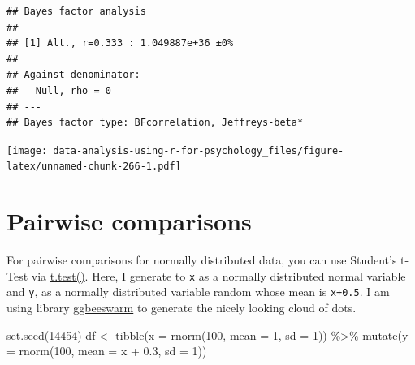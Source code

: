 \documentclass[
]{book}
\newenvironment{Shaded}{\begin{snugshade}}{\end{snugshade}}
\newcommand{\AttributeTok}[1]{\textcolor[rgb]{0.77,0.63,0.00}{#1}}
\newcommand{\ConstantTok}[1]{\textcolor[rgb]{0.00,0.00,0.00}{#1}}
\newcommand{\DecValTok}[1]{\textcolor[rgb]{0.00,0.00,0.81}{#1}}
\newcommand{\FloatTok}[1]{\textcolor[rgb]{0.00,0.00,0.81}{#1}}
\newcommand{\FunctionTok}[1]{\textcolor[rgb]{0.00,0.00,0.00}{#1}}
\newcommand{\NormalTok}[1]{#1}
\newcommand{\OtherTok}[1]{\textcolor[rgb]{0.56,0.35,0.01}{#1}}
\newcommand{\SpecialCharTok}[1]{\textcolor[rgb]{0.00,0.00,0.00}{#1}}
\newcommand{\StringTok}[1]{\textcolor[rgb]{0.31,0.60,0.02}{#1}}
\begin{document}
\begin{verbatim}
## Bayes factor analysis
## --------------
## [1] Alt., r=0.333 : 1.049887e+36 ±0%
## 
## Against denominator:
##   Null, rho = 0 
## ---
## Bayes factor type: BFcorrelation, Jeffreys-beta*
\end{verbatim}

\begin{Shaded}
\end{Shaded}

\texttt{[image: data-analysis-using-r-for-psychology\_files/figure-latex/unnamed-chunk-266-1.pdf]}

\hypertarget{pairwise-comparisons}{%
\section{Pairwise comparisons}\label{pairwise-comparisons}}

For pairwise comparisons for normally distributed data, you can use Student's t-Test via \href{https://stat.ethz.ch/R-manual/R-devel/library/stats/html/t.test.html}{t.test()}. Here, I generate to \texttt{x} as a normally distributed normal variable and \texttt{y}, as a normally distributed variable random whose mean is \texttt{x+0.5}. I am using library \href{https://github.com/eclarke/ggbeeswarm}{ggbeeswarm} to generate the nicely looking cloud of dots.

\begin{Shaded}
\begin{Highlighting}[]
\FunctionTok{set.seed}\NormalTok{(}\DecValTok{14454}\NormalTok{)}
\NormalTok{df }\OtherTok{\textless{}{-}} 
  \FunctionTok{tibble}\NormalTok{(}\AttributeTok{x =} \FunctionTok{rnorm}\NormalTok{(}\DecValTok{100}\NormalTok{, }\AttributeTok{mean =} \DecValTok{1}\NormalTok{, }\AttributeTok{sd =} \DecValTok{1}\NormalTok{)) }\SpecialCharTok{\%\textgreater{}\%}
  \FunctionTok{mutate}\NormalTok{(}\AttributeTok{y =} \FunctionTok{rnorm}\NormalTok{(}\DecValTok{100}\NormalTok{, }\AttributeTok{mean =}\NormalTok{ x }\SpecialCharTok{+} \FloatTok{0.3}\NormalTok{, }\AttributeTok{sd =} \DecValTok{1}\NormalTok{))}
\end{Highlighting}
\end{Shaded}
\end{document}
